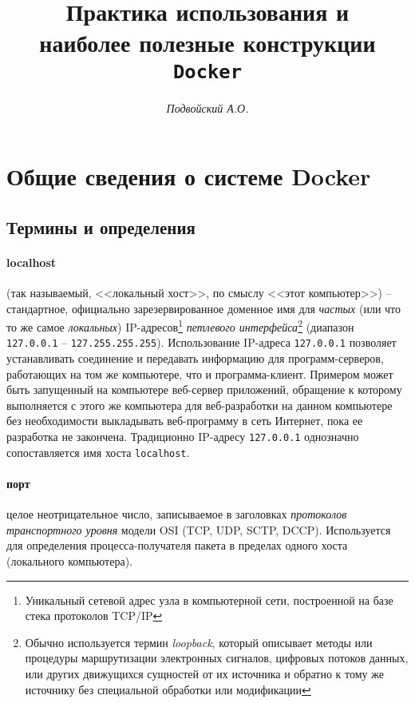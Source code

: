 \documentclass[%
	11pt,
	a4paper,
	utf8,
		]{article}
\begin{document}
\title{Практика использования и \\наиболее полезные конструкции \texttt{Docker}}

\author{\itshape Подвойский А.О.}

\date{}
\maketitle

\thispagestyle{fancy}

\tableofcontents

\section{Общие сведения о системе Docker}

\subsection{Термины и определения}

\paragraph{{localhost}} (так называемый, <<локальный хост>>, по смыслу <<этот компьютер>>) -- стандартное, официально зарезервированное доменное имя для \emph{частых} (или что то же самое \emph{локальных}) IP-адресов\footnote{Уникальный сетевой адрес узла в компьютерной сети, построенной на базе стека протоколов TCP/IP} \emph{петлевого интерфейса}\footnote{Обычно используется термин \emph{loopback}, который описывает методы или процедуры маршрутизации электронных сигналов, цифровых потоков данных, или других движущихся сущностей от их источника и обратно к тому же источнику без специальной обработки или модификации} (диапазон \texttt{127.0.0.1} -- \texttt{127.255.255.255}). Использование IP-адреса \texttt{127.0.0.1} позволяет устанавливать соединение и передавать информацию для программ-серверов, работающих на том же компьютере, что и программа-клиент. Примером может быть запущенный на компьютере веб-сервер приложений, обращение к которому выполняется с этого же компьютера для веб-разработки на данном компьютере без необходимости выкладывать веб-программу в сеть Интернет, пока ее разработка не закончена. Традиционно IP-адресу \texttt{127.0.0.1} однозначно сопоставляется имя хоста \texttt{localhost}.

\paragraph{{порт}} целое неотрицательное число, записываемое в заголовках \emph{протоколов транспортного уровня} модели OSI (TCP, UDP, SCTP, DCCP). Используется для определения процесса-получателя пакета в пределах одного хоста (локального компьютера).
\end{document}
